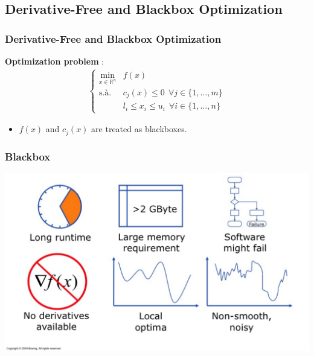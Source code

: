 \documentclass[11pt,utf8,compress]{beamer}
\def\R{{\mathbb{R}}}
\begin{document}
\subsection{Derivative-Free and Blackbox Optimization}
\begin{frame} %
\frametitle{Derivative-Free and Blackbox Optimization}
\textbf{Optimization problem} :
\begin{align*}
\begin{cases}
\underset{x\in \R^n}{\min} & f(x) \\
\text{s.à.} & c_j(x) \leq 0 ~ ~ \forall j \in \{1,\dots,m\}\\
~ & l_i \leq x_i \leq u_i ~ ~ \forall i \in \{1,\dots,n\}
\end{cases}
\end{align*}
\begin{itemize}
\pause
\item $f(x)$ and $c_j(x)$ are treated as blackboxes.
\end{itemize}
\bigskip
\end{frame}
\begin{frame}%
\frametitle{Blackbox}
\includegraphics[width=\linewidth]{blackbox.png}
\end{frame}
\end{document}
